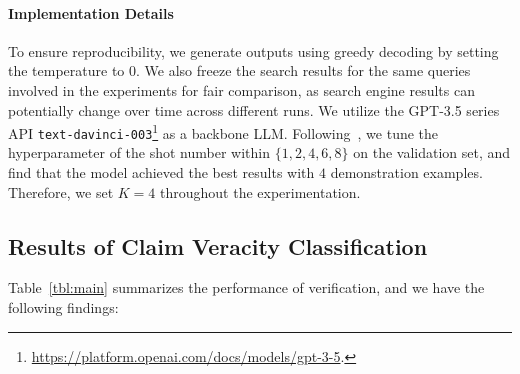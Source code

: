 \documentclass[11pt]{article}
\begin{document}
\paragraph{Implementation Details}
  To ensure reproducibility, we generate outputs using greedy decoding by setting the temperature to $0$. We also freeze the search results for the same queries involved in the experiments for fair comparison, as search engine results can potentially change over time across different runs.
We utilize the GPT-3.5 series API \texttt{text-davinci-003}\footnote{\url{https://platform.openai.com/docs/models/gpt-3-5}.} as a backbone LLM.
Following~\citet{wei2022chain}, we tune the hyperparameter of the shot number within $\{1, 2, 4, 6, 8\}$ on the validation set, and find that the model achieved the best results with $4$ demonstration examples. Therefore, we set $K=4$ throughout the experimentation.

\subsection{Results of Claim Veracity Classification}

Table~\ref{tbl:main} summarizes the performance of verification, and we have the following findings:
\end{document}
